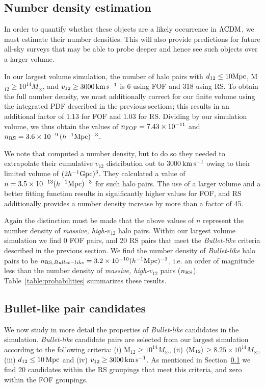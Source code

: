 \documentclass[useAMS, usenatbib]{mn2e}
\newcommand{\Msun}{M_{\odot}}
\newcommand{\hinv}{h^{-1}}
\newcommand{\vonetwo}{v_{12}}
\newcommand{\lcdm}{\Lambda\rm{CDM}}
\newcommand{\kms}{\,\rm{km}\,\rm{s}^{-1}}
\begin{document}
\subsection{Number density estimation}
\label{sec:ndensity}
In order to quantify whether these objects are a likely occurrence in $\lcdm$, 
we must estimate their number densities.
This will also provide predictions for future all-sky surveys that may
be able to probe deeper and hence see such objects over a larger
volume.

In our largest volume simulation, the number of halo pairs with
$d_{12}\leq10\rm{Mpc}$, M$_{12}\geq10^{14}\Msun$, and
$\vonetwo\geq3000\kms$ is 6 using FOF and 318 using RS.  To obtain
the full number density, we must additionally correct for our finite
volume using the integrated PDF described in the previous
sections; this results in an additional factor of $1.13$ for FOF
and $1.03$ for RS.  Dividing by our
simulation volume, we thus obtain the values of
$n_{\rm{FOF}}=7.43\times10^{-11}$ and
$n_{\rm{RS}}=3.6\times10^{-9}\,(\hinv\rm{Mpc})^{-3}$.

We note that \citet{Thompson12} computed a number density, but to
do so they needed to extrapolate their cumulative
$\vonetwo$ distribution out to 3000$\kms$ owing to their limited
volume of $(2\hinv\rm{Gpc})^3$.  They calculated a value of
$n=3.5\times10^{-13}(\hinv\rm{Mpc})^{-3}$ for such halo pairs.
The use of a larger volume and a better fitting function results
in significantly higher values for FOF, and RS additionally provides
a number density increase by more than a factor of 45.

Again the distinction must be made that the above values of $n$ 
represent the number density of {\it massive, high-$\vonetwo$} halo pairs.
Within our largest volume simulation we find 0 FOF pairs, and 20 RS pairs that meet the {\it Bullet-like} criteria described in the previous section.
We find the number density of {\it Bullet-like} halo pairs to be $n_{{\rm RS},Bullet-like}=3.2\times10^{-10} (\hinv\rm{Mpc})^{-3}$,
i.e. an order of magnitude less than the number density of {\it massive, high-$\vonetwo$} pairs
($n_{\rm{RS}}$).
Table~\ref{table:probabilities} summarizes these results.


\subsection{Bullet-like pair candidates}
\label{sec:candidates}

We now study in more detail the properties of {\it Bullet-like} candidates
in the simulation.  {\it Bullet-like} candidate pairs are selected from
our largest simulation according to the following criteria:
(i) M$_{12}\geq10^{14}\Msun$,
(ii) $\left<\rm{M_{12}}\right>$$\geq8.25\times10^{14}\Msun$,
(iii) $d_{12}\leq10\,\rm{Mpc}$ and
(iv) $\vonetwo\geq3000\kms$.  
As mentioned in Section~\ref{sec:ndensity} we find 20 candidates
within the RS groupings that meet this criteria, and zero within
the FOF groupings.
\end{document}
